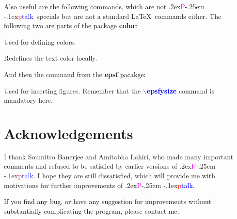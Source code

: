 \documentclass[12pt]{article}
\def\pptalk{{
\raise.2ex\hbox{\textcolor{magenta}P}\kern-.25em
\raise-.1ex\hbox{\textcolor{red}p}\textcolor{blue}{talk}}}
\def\ecomm#1{{\textcolor{blue}{$\backslash${\bf #1}}}}
\def\file#1{\textcolor{darkpurple}{\bf #1}}
\begin{document}
Also useful are the following commands,  which
are not \pptalk\ specials but are not a standard \LaTeX\ commands 
either.  The following two are parts of the package \file{color}:
%
\begin{list}{}{}
\item[\ecomm{definecolor}] Used for defining colors.

\item[\ecomm{textcolor}] Redefines the text color locally.

\end{list}

And then the command from the \file{epsf} pacakge:
%
\begin{list}{}{}
\item[\ecomm{epsfbox}] Used for inserting figures. Remember that the
\ecomm{epsfysize} command is mandatory here.

\end{list}

\endslide




\beginslide
%
\section{Acknowledgements}  I thank Soumitro Banerjee and Amitabha
Lahiri, who made many important comments and refused to be satisfied
by earlier versions of \pptalk.  I hope they are still dissatisfied,
which will provide me with motivations for further improvements of
\pptalk.

If you find any bug, or have any suggestion for improvements without
substantially complicating the program, please contact me.

\endslide
\end{document}
